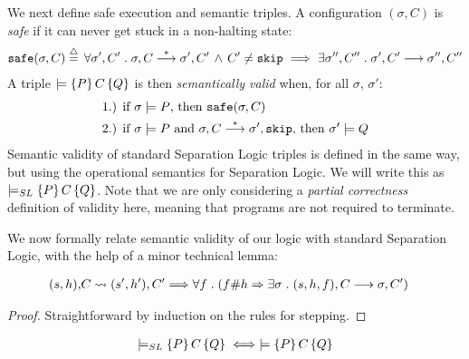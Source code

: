 \fi
\ifextended
We next define safe execution and semantic triples. A configuration $(\sigma,C)$
is \emph{safe} if it can never get stuck in a non-halting state:
\begin{align*}
\text{\tt{safe}}(\sigma,C) \stackrel{\triangle}{=} \, \forall \sigma',C' \hspace{1mm} . \hspace{1mm} 
\sigma,C \stackrel{*}{\longrightarrow} \sigma',C' \, \land \, C' \neq \text{\tt{skip}} 
\,\, \Longrightarrow \,\, \exists \sigma'',C'' \hspace{1mm} . \hspace{1mm} \sigma',C' \longrightarrow \sigma'',C''
\end{align*}
\noindent{}
A triple $\models \left\{P\right\} C \left\{Q\right\}$ is then \emph{semantically valid} when, for all $\sigma$, $\sigma'$:
\begin{align*}
& \text{1.) if } \sigma \models P\text{, then } \text{\tt{safe}}(\sigma,C) \\
& \text{2.) if } \sigma \models P \text{ and } \sigma,C \stackrel{*}{\longrightarrow} \sigma',\text{\tt{skip}} \text{, then } \sigma' \models Q
\end{align*}
Semantic validity of standard Separation Logic triples is defined in the same way, but using the operational semantics
for Separation Logic. We will write this as $\models_{SL} \{P\}\,C\,\{Q\}$. Note that we are only considering a
\emph{partial correctness} definition of validity here, meaning that programs are not required to terminate.

We now formally relate semantic validity of our logic with standard Separation Logic,
with the help of a minor technical lemma:

\begin{lem}
\label{safestep}
\begin{align*}
(s,h), & C \leadsto (s',h'),C' \Longrightarrow \forall f \hspace{1mm} . \hspace{1mm} (f \# h \Rightarrow \exists \sigma \hspace{1mm} . \hspace{1mm} (s,h,f),C \longrightarrow \sigma,C')
\end{align*}
\end{lem}

\begin{proof}
Straightforward by induction on the rules for stepping.
\end{proof}

\begin{thm}
\label{semantic-equiv}
\begin{align*}
\models_{SL} \{P\}\,C\,\{Q\} \iff \models \left\{P\right\} C \left\{Q\right\}
\end{align*}
\end{thm}

